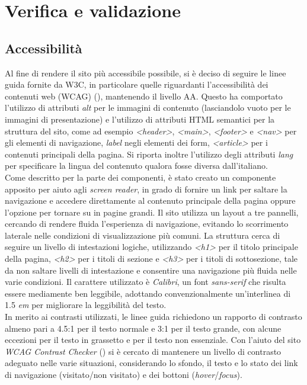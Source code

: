 \chapter{Verifica e validazione}
\label{cap:verifica-validazione}

\section{Accessibilità}\label{sec:verifica-validazione-accessibilita}

Al fine di rendere il sito più accessibile possibile, si è deciso di seguire le linee guida fornite da W3C, in particolare quelle riguardanti l'accessibilità dei contenuti web (WCAG) (\cite{site:wcag}), mantenendo il livello AA.
Questo ha comportato l'utilizzo di attributi \textit{alt} per le immagini di contenuto (lasciandolo vuoto per le immagini di presentazione) e l'utilizzo di attributi HTML semantici per la struttura del sito, come 
ad esempio \textit{<header>}, \textit{<main>}, \textit{<footer>} e \textit{<nav>} per gli elementi di navigazione, \textit{label} negli elementi dei form, \textit{<article>} per i contenuti principali della pagina.
Si riporta inoltre l'utilizzo degli attributi \textit{lang} per specificare la lingua del contenuto qualora fosse diversa dall'italiano. \\

Come descritto per la parte dei componenti, è stato creato un componente apposito per aiuto agli \textit{screen reader}, in grado di fornire un link per saltare la navigazione e accedere direttamente al contenuto principale della pagina
oppure l'opzione per tornare su in pagine grandi.
Il sito utilizza un layout a tre pannelli, cercando di rendere fluida l'esperienza di navigazione, evitando lo scorrimento laterale nelle condizioni di visualizzazione più comuni.
La struttura cerca di seguire un livello di intestazioni logiche, utilizzando \textit{<h1>} per il titolo principale della pagina, \textit{<h2>} per i titoli di sezione e \textit{<h3>} per i titoli di sottosezione,
tale da non saltare livelli di intestazione e consentire una navigazione più fluida nelle varie condizioni.
Il carattere utilizzato è \textit{Calibri}, un font \textit{sans-serif} che risulta essere mediamente ben leggibile, adottando convenzionalmente un'interlinea di 1.5 \textit{em} per migliorare la leggibilità del testo. \\

In merito ai contrasti utilizzati, le linee guida richiedono un rapporto di contrasto almeno pari a 4.5:1 per il testo normale e 3:1 per il testo grande, con alcune eccezioni per il testo in grassetto e per il testo non essenziale.
Con l'aiuto del sito \textit{WCAG Contrast Checker} (\cite{site:wcagcontrastchecker}) si è cercato di mantenere un livello di contrasto adeguato nelle varie situazioni, considerando lo sfondo, il testo e lo stato dei link di navigazione (visitato/non visitato) e dei bottoni (\textit{hover}/\textit{focus}).

